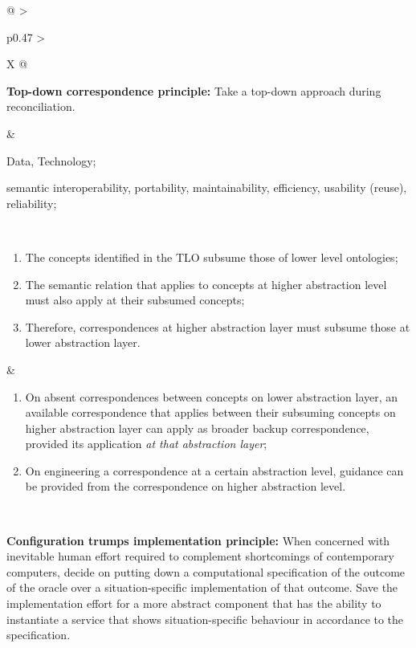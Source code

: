 \begin{xltabular}[l]{\linewidth}{@{} >{\small\raggedright\arraybackslash}p{0.47\linewidth} >{\small\raggedright\arraybackslash}X @{}}
\begin{mmdp}\label{dp:tdc}{\bfseries Top-down correspondence principle:}
\quad Take a top-down approach during reconciliation. \end{mmdp}
&
\begin{description}[labelwidth=3.7cm,leftmargin=3.7cm+1ex,nosep,topsep=2ex,labelsep=1ex,font=\bfseries]
\item[Type of information:] Data, Technology;
\item[Quality attributes:] semantic interoperability, portability, maintainability, efficiency, usability (reuse), reliability;
\end{description}
\\
\begin{enumerate}[left=6pt, nosep]
  \item The concepts identified in the TLO subsume those of lower level ontologies;
  \item The semantic relation that applies to concepts at higher abstraction level must also apply at their subsumed concepts;
  \item Therefore, correspondences at higher abstraction layer must subsume those at lower abstraction layer.
\end{enumerate}
&
\begin{enumerate}[left=10pt, nosep]
  \item On absent correspondences between concepts on lower abstraction layer, an available correspondence that applies between their subsuming concepts on higher abstraction layer can apply as broader backup correspondence, provided its application \emph{at that abstraction layer};
  \item On engineering a correspondence at a certain abstraction level, guidance can be provided from the correspondence on higher abstraction level.
\end{enumerate} \\
%
%
%
\begin{mmdp}\label{dp:cti}{\bfseries Configuration trumps implementation principle:}
\quad When concerned with inevitable human effort required to complement shortcomings of contemporary computers, decide on putting down a computational specification of the outcome of the oracle over a situation-specific implementation of that outcome. Save the implementation effort for a more abstract component that has the ability to instantiate a service that shows situation-specific behaviour in accordance to the specification. \end{mmdp}

\end{xltabular}
